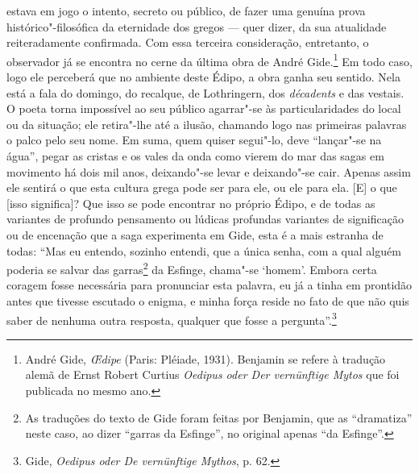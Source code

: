 estava em jogo o intento, secreto ou público, de fazer uma genuína prova
histórico"-filosófica da eternidade dos gregos --- quer dizer, da sua
atualidade reiteradamente confirmada. Com essa terceira consideração,
entretanto, o observador já se encontra no cerne da última obra de André
Gide.\footnote{André Gide, \emph{\OE dipe} (Paris: Pléiade, 1931).
  Benjamin se refere à tradução alemã de Ernst Robert Curtius
  \emph{Oedipus oder Der vernünftige Mytos} que foi publicada no mesmo
  ano. \versal{[N. T.]}} Em todo caso, logo ele perceberá que no ambiente deste Édipo, a
obra ganha seu sentido. Nela está a fala do domingo, do recalque, de
Lothringern, dos \emph{décadents} e das vestais. O poeta torna
impossível ao seu público agarrar"-se às particularidades do local ou da
situação; ele retira"-lhe até a ilusão, chamando logo nas primeiras
palavras o palco pelo seu nome. Em suma, quem quiser segui"-lo, deve
``lançar"-se na água'', pegar as cristas e os vales da onda como vierem
do mar das sagas em movimento há dois mil anos, deixando"-se levar e
deixando"-se cair. Apenas assim ele sentirá o que esta cultura grega pode
ser para ele, ou ele para ela. {[}E{]} o que {[}isso significa{]}? Que
isso se pode encontrar no próprio Édipo, e de todas as variantes de
profundo pensamento ou lúdicas profundas variantes de significação ou de
encenação que a saga experimenta em Gide, esta é a mais estranha de
todas: ``Mas eu entendo, sozinho entendi, que a única senha, com a qual
alguém poderia se salvar das garras\footnote{As traduções do texto
  de Gide foram feitas por Benjamin, que as ``dramatiza'' neste caso, ao
  dizer ``garras da Esfinge'', no original apenas ``da Esfinge''. \versal{[N. E.]}} da
Esfinge, chama"-se `homem'. Embora certa coragem fosse necessária para
pronunciar esta palavra, eu já a tinha em prontidão antes que tivesse
escutado o enigma, e minha força reside no fato de que não quis saber de
nenhuma outra resposta, qualquer que fosse a pergunta''.\footnote{Gide, \emph{Oedipus oder De vernünftige Mythos}, p. 62. \versal{[N. T.]}}

